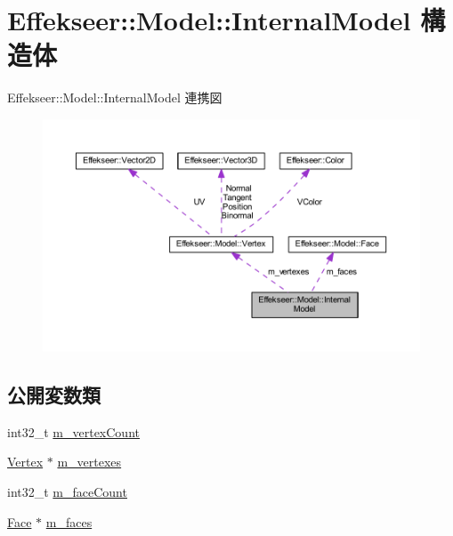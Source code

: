 \hypertarget{struct_effekseer_1_1_model_1_1_internal_model}{}\section{Effekseer\+:\+:Model\+:\+:Internal\+Model 構造体}
\label{struct_effekseer_1_1_model_1_1_internal_model}


Effekseer\+:\+:Model\+:\+:Internal\+Model 連携図\nopagebreak
\begin{figure}[H]
\begin{center}
\leavevmode
\includegraphics[width=350pt]{struct_effekseer_1_1_model_1_1_internal_model__coll__graph}
\end{center}
\end{figure}
\subsection*{公開変数類}
\begin{DoxyCompactItemize}
\item 
int32\+\_\+t \mbox{\hyperlink{struct_effekseer_1_1_model_1_1_internal_model_a6b90b5a53696efdabac0d4708dcb3550}{m\+\_\+vertex\+Count}}
\item 
\mbox{\hyperlink{struct_effekseer_1_1_model_1_1_vertex}{Vertex}} $\ast$ \mbox{\hyperlink{struct_effekseer_1_1_model_1_1_internal_model_a8a41ac246ef524cf4aa0197b2ce1b449}{m\+\_\+vertexes}}
\item 
int32\+\_\+t \mbox{\hyperlink{struct_effekseer_1_1_model_1_1_internal_model_a0600f7243cd74d0215e97f7083aef405}{m\+\_\+face\+Count}}
\item 
\mbox{\hyperlink{struct_effekseer_1_1_model_1_1_face}{Face}} $\ast$ \mbox{\hyperlink{struct_effekseer_1_1_model_1_1_internal_model_a3379f247818edb1c0abcdb16d237f309}{m\+\_\+faces}}
\end{DoxyCompactItemize}


